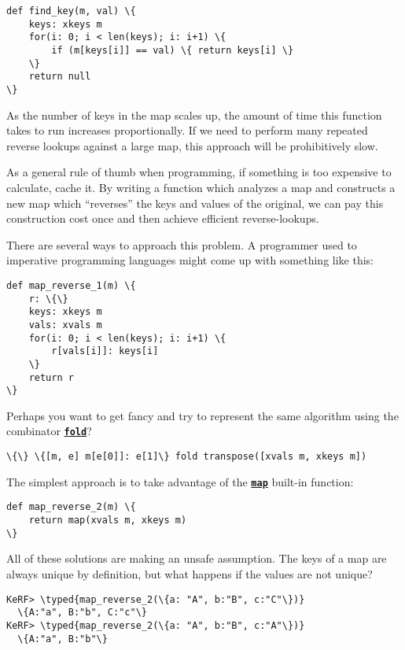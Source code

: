\documentclass{article}
\newcommand{\typed}[1]{\textcolor{TealBlue}{#1}}
\newcommand{\primu}[2]{\hyperref[prim:#2]{\textbf{\texttt{#1}}}}
\newcommand{\prim}[1]{\primu{#1}{#1}}
\newcommand{\comb}[1]{\primu{#1}{#1}}
\begin{document}
\begin{Verbatim}
def find_key(m, val) \{
	keys: xkeys m
	for(i: 0; i < len(keys); i: i+1) \{
		if (m[keys[i]] == val) \{ return keys[i] \}
	\}
	return null
\}
\end{Verbatim}

As the number of keys in the map scales up, the amount of time this function takes to run increases proportionally. If we need to perform many repeated reverse lookups against a large map, this approach will be prohibitively slow.

\vspace{0.5cm}

As a general rule of thumb when programming, if something is too expensive to calculate, cache it. By writing a function which analyzes a map and constructs a new map which ``reverses'' the keys and values of the original, we can pay this construction cost once and then achieve efficient reverse-lookups.

\vspace{0.5cm}

There are several ways to approach this problem. A programmer used to imperative programming languages might come up with something like this:

\begin{Verbatim}
def map_reverse_1(m) \{
	r: \{\}
	keys: xkeys m
	vals: xvals m
	for(i: 0; i < len(keys); i: i+1) \{
		r[vals[i]]: keys[i]
	\}
	return r
\}
\end{Verbatim}

Perhaps you want to get fancy and try to represent the same algorithm using the combinator \comb{fold}?

\begin{Verbatim}
\{\} \{[m, e] m[e[0]]: e[1]\} fold transpose([xvals m, xkeys m])
\end{Verbatim}

The simplest approach is to take advantage of the \prim{map} built-in function:

\begin{Verbatim}
def map_reverse_2(m) \{
	return map(xvals m, xkeys m)
\}
\end{Verbatim}

\pagebreak
All of these solutions are making an unsafe assumption. The keys of a map are always unique by definition, but what happens if the values are not unique?

\begin{Verbatim}
KeRF> \typed{map_reverse_2(\{a: "A", b:"B", c:"C"\})}
  \{A:"a", B:"b", C:"c"\}
KeRF> \typed{map_reverse_2(\{a: "A", b:"B", c:"A"\})}
  \{A:"a", B:"b"\}
\end{Verbatim}
\end{document}
